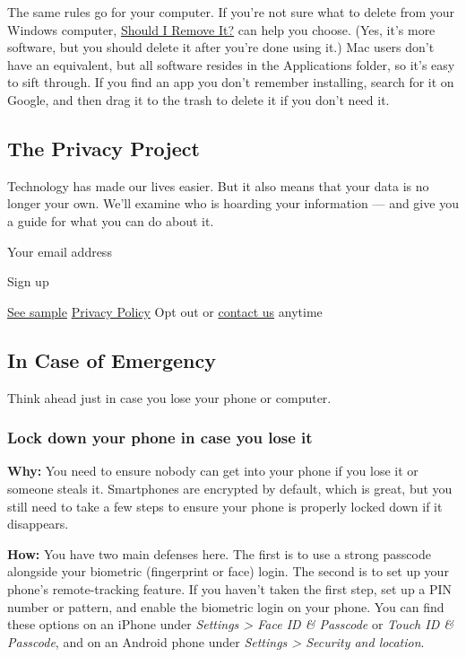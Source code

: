 The same rules go for your computer. If you're not sure what to delete
from your Windows computer,
\href{https://www.shouldiremoveit.com/}{Should I Remove It?} can help
you choose. (Yes, it's more software, but you should delete it after
you're done using it.) Mac users don't have an equivalent, but all
software resides in the Applications folder, so it's easy to sift
through. If you find an app you don't remember installing, search for it
on Google, and then drag it to the trash to delete it if you don't need
it.

\hypertarget{the-privacy-project}{%
\subsection{The Privacy Project}\label{the-privacy-project}}

Technology has made our lives easier. But it also means that your data
is no longer your own. We'll examine who is hoarding your information
--- and give you a guide for what you can do about it.

Your email address

Sign up

\href{https://www.nytimes.com/newsletters/sample/real-estate}{See
sample} \textbar{}
\href{https://www.nytimes.com/content/help/rights/privacy/policy/privacy-policy.html}{Privacy
Policy} \textbar{} Opt out or
\href{https://www.nytimes.com/help/index.html}{contact us} anytime

\hypertarget{in-case-of-emergency}{%
\subsection{In Case of Emergency}\label{in-case-of-emergency}}

Think ahead just in case you lose your phone or computer.~

\hypertarget{lock-down-your-phone-in-case-you-lose-it}{%
\subsubsection{Lock down your phone in case you lose
it}\label{lock-down-your-phone-in-case-you-lose-it}}

\textbf{Why:} You need to ensure nobody can get into your phone if you
lose it or someone steals it. Smartphones are encrypted by default,
which is great, but you still need to take a few steps to ensure your
phone is properly locked down if it disappears.~

\textbf{How:} You have two main defenses here. The first is to use a
strong passcode alongside your biometric (fingerprint or face) login.
The second is to set up your phone's remote-tracking feature. If you
haven't taken the first step, set up a PIN number or pattern, and enable
the biometric login on your phone. You can find these options on an
iPhone under \emph{Settings \textgreater{} Face ID \& Passcode} or
\emph{Touch ID \& Passcode}, and on an Android phone under
\emph{Settings \textgreater{} Security and location}.

